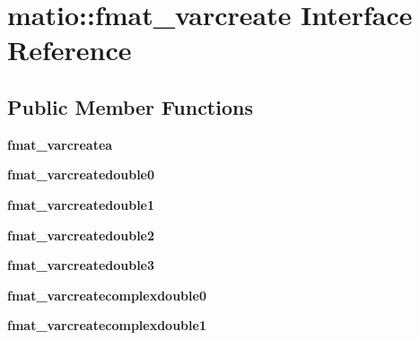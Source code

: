 \hypertarget{interfacematio_1_1fmat__varcreate}{}\section{matio\+:\+:fmat\+\_\+varcreate Interface Reference}
\label{interfacematio_1_1fmat__varcreate}
\subsection*{Public Member Functions}
\begin{DoxyCompactItemize}
\item 
\mbox{\label{interfacematio_1_1fmat__varcreate_a274a080e07cdcc3e753a1bd72c6bbbfa}} 
{\bfseries fmat\+\_\+varcreatea}
\item 
\mbox{\label{interfacematio_1_1fmat__varcreate_a4a984c519117e57658a4580922465fd2}} 
{\bfseries fmat\+\_\+varcreatedouble0}
\item 
\mbox{\label{interfacematio_1_1fmat__varcreate_a595ce1c26b7906b8e9baca6ba1a283ce}} 
{\bfseries fmat\+\_\+varcreatedouble1}
\item 
\mbox{\label{interfacematio_1_1fmat__varcreate_ae1ca7a2528afa06289dfa6986859857e}} 
{\bfseries fmat\+\_\+varcreatedouble2}
\item 
\mbox{\label{interfacematio_1_1fmat__varcreate_a3908eed209a63f6475791f642e674126}} 
{\bfseries fmat\+\_\+varcreatedouble3}
\item 
\mbox{\label{interfacematio_1_1fmat__varcreate_abefcb40199c3824af8c93d8fa100b70a}} 
{\bfseries fmat\+\_\+varcreatecomplexdouble0}
\item 
\mbox{\label{interfacematio_1_1fmat__varcreate_a91c6cc3ac3509d55d01ec033cdb08aa1}} 
{\bfseries fmat\+\_\+varcreatecomplexdouble1}
\item 
\mbox{\label{interfacematio_1_1fmat__varcreate_acbd65c5940e6f8d74b22d3a6b1129b6f}} 

\end{DoxyCompactItemize}
